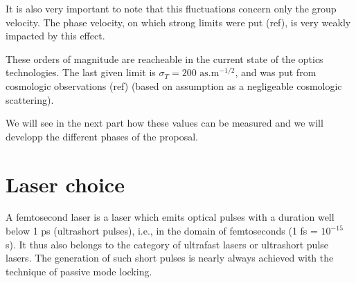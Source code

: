 \documentclass[9pt, a4, twoside]{article}
\begin{document}
It is also very important to note that this fluctuations concern only the group velocity. The phase velocity, on which strong limits were put (ref), is very weakly impacted by this effect.

These orders of magnitude are reacheable in the current state of the optics technologies. The last given limit is $\sigma_T=200\text{ as.m}^{-1/2}$, and was put from cosmologic observations (ref) (based on assumption as a negligeable cosmologic scattering).

We will see in the next part how these values can be measured and we will developp the different phases of the proposal.




\section{Laser choice}
A femtosecond laser is a laser which emits optical pulses with a duration well below 1 ps (ultrashort pulses), i.e., in the domain of femtoseconds (1 fs = $10^{-15}$ s). It thus also belongs to the category of ultrafast lasers or ultrashort pulse lasers. The generation of such short pulses is nearly always achieved with the technique of passive mode locking.
\end{document}
